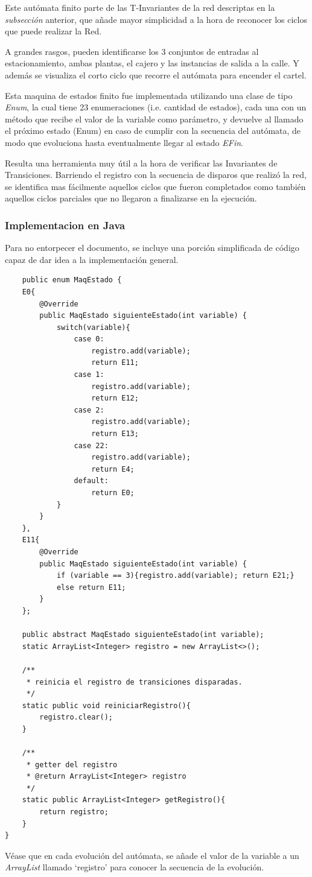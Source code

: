 \documentclass[12pt,a4paper]{article}
\begin{document}
Este autómata finito parte de las T-Invariantes de la red descriptas en la \textit{subsección} anterior, que añade mayor simplicidad a la hora de reconocer los ciclos que puede realizar la Red.

A grandes rasgos, pueden identificarse los 3 conjuntos de entradas al estacionamiento, ambas plantas, el cajero y las instancias de salida a la calle. Y además se visualiza el corto ciclo que recorre el autómata para encender el cartel.

Esta maquina de estados finito fue implementada utilizando una clase de tipo \textit{Enum}, la cual tiene 23 enumeraciones (i.e. cantidad de estados), cada una con un método que recibe el valor de la variable como parámetro, y devuelve al llamado el próximo estado (Enum) en caso de cumplir con la secuencia del autómata, de modo que evoluciona hasta eventualmente llegar al estado \textit{EFin}.

Resulta una herramienta muy útil a la hora de verificar las Invariantes de Transiciones. Barriendo el registro con la secuencia de disparos que realizó la red, se identifica mas fácilmente aquellos ciclos que fueron completados como también aquellos ciclos parciales que no llegaron a finalizarse en la ejecución.

\subsubsection*{Implementacion en Java}
Para no entorpecer el documento, se incluye una porción simplificada de código capaz de dar idea a la implementación general.

\begin{lstlisting}
    public enum MaqEstado {
    E0{
        @Override
        public MaqEstado siguienteEstado(int variable) {
            switch(variable){
                case 0:
                    registro.add(variable);
                    return E11;
                case 1:
                    registro.add(variable);
                    return E12;
                case 2:
                    registro.add(variable);
                    return E13;
                case 22:
                    registro.add(variable);
                    return E4;
                default:
                    return E0;
            }
        }
    },
    E11{
        @Override
        public MaqEstado siguienteEstado(int variable) {
            if (variable == 3){registro.add(variable); return E21;}
            else return E11;
        }
    };
    
    public abstract MaqEstado siguienteEstado(int variable);
    static ArrayList<Integer> registro = new ArrayList<>();
    
    /**
     * reinicia el registro de transiciones disparadas.
     */
    static public void reiniciarRegistro(){
        registro.clear();
    }
    
    /**
     * getter del registro
     * @return ArrayList<Integer> registro
     */
    static public ArrayList<Integer> getRegistro(){
        return registro;
    }
}
\end{lstlisting}
Véase que en cada evolución del autómata, se añade el valor de la variable a un \textit{ArrayList} llamado `registro' para conocer la secuencia de la evolución.
\end{document}
